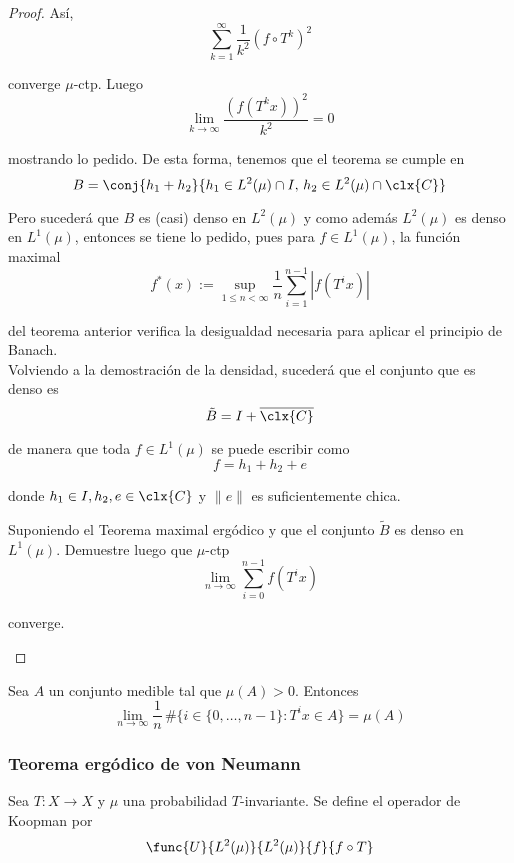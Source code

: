 \documentclass[	docname= Sistemas\ Din\'amicos,
				finished=1,
				semester=1,
				year=2017,
				professor=Godofredo\ Iommi,
				sigla=MAT2565]{apunte}
\begin{document}
\begin{proof}
Así, 
	$$\sum_{k=1}^{\infty} \frac{1}{k^{2}} (f \circ T^{k})^{2}$$

converge $\mu$-ctp. Luego
	$$\lim_{k \to \infty} \frac{(f(T^{k}x))^{2}}{k^{2}} = 0$$
	
mostrando lo pedido. De esta forma, tenemos que el teorema se cumple en
	$$B = \conj{h_{1} + h_{2}}{h_{1} \in L^{2}(\mu) \cap I, \, h_{2} \in L^{2}(\mu) \cap \clx{C}}$$

Pero sucederá que $B$ es (casi) denso en $L^{2}(\mu)$ y como además $L^{2}(\mu)$ es denso en $L^{1}(\mu)$, entonces se tiene lo pedido, pues para $f \in L^{1}(\mu)$, la función maximal
	$$f^{*}(x) := \sup_{1\leq n < \infty} \frac{1}{n} \sum_{i=1}^{n-1} |f(T^{i}x)|$$

del teorema anterior verifica la desigualdad necesaria para aplicar el principio de Banach.	\\

Volviendo a la demostración de la densidad, sucederá que el conjunto que es denso es
	$$\tilde{B} = I + \overline{\clx{C}}$$

de manera que toda $f \in L^{1}(\mu)$ se puede escribir como
	$$f = h_{1} + h_{2} + e$$

donde $h_{1} \in I, h_{2}, e \in \clx{C}$ y $\|e\|$ es suficientemente chica.

\begin{ej} Suponiendo el Teorema maximal ergódico y que el conjunto $\tilde{B}$ es denso en $L^{1}(\mu)$. Demuestre luego que $\mu$-ctp
	$$\lim_{n \to \infty} \sum_{i=0}^{n-1} f(T^{i}x)$$

converge.
\end{ej}
 
\end{proof}

\begin{cor} Sea $A$ un conjunto medible tal que $\mu(A) > 0$. Entonces
	$$\lim_{n \to \infty} \frac{1}{n}\, \#\{i \in \{0, \ldots, n-1\} : T^{i}x \in A\} = \mu(A)$$
\end{cor}

\subsubsection{Teorema ergódico de von Neumann}
\begin{defn} Sea $T: X \to X$ y $\mu$ una probabilidad $T$-invariante. Se define el operador de Koopman por
	$$\func{U}{L^{2}(\mu)}{L^{2}(\mu)}
			{f}{f \circ T}$$
\end{defn}
\end{document}
